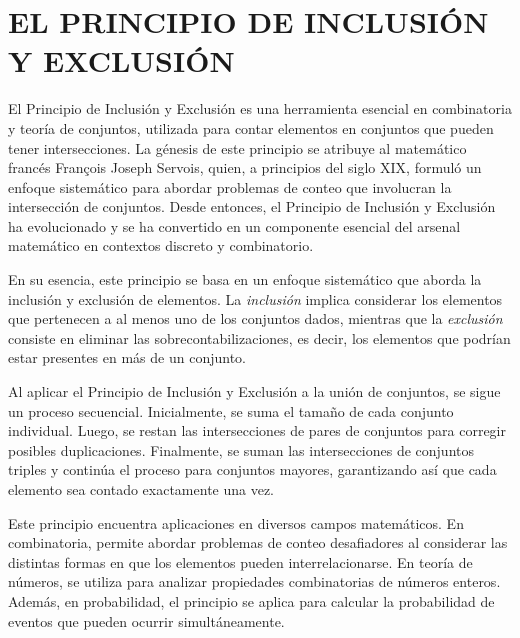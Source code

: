 \chapterspaceabove{6.75cm} %
\chapterspacebelow{7.25cm} %


\chapter{EL PRINCIPIO DE INCLUSIÓN Y EXCLUSIÓN}

El Principio de Inclusión y Exclusión es una herramienta esencial en combinatoria y teoría de conjuntos, utilizada para contar elementos en conjuntos que pueden tener intersecciones. La génesis de este principio se atribuye al matemático francés François Joseph Servois, quien, a principios del siglo XIX, formuló un enfoque sistemático para abordar problemas de conteo que involucran la intersección de conjuntos. Desde entonces, el Principio de Inclusión y Exclusión ha evolucionado y se ha convertido en un componente esencial del arsenal matemático en contextos discreto y combinatorio.

En su esencia, este principio se basa en un enfoque sistemático que aborda la inclusión y exclusión de elementos. La \textit{inclusión} implica considerar los elementos que pertenecen a al menos uno de los conjuntos dados, mientras que la \textit{exclusión} consiste en eliminar las sobrecontabilizaciones, es decir, los elementos que podrían estar presentes en más de un conjunto.

Al aplicar el Principio de Inclusión y Exclusión a la unión de conjuntos, se sigue un proceso secuencial. Inicialmente, se suma el tamaño de cada conjunto individual. Luego, se restan las intersecciones de pares de conjuntos para corregir posibles duplicaciones. Finalmente, se suman las intersecciones de conjuntos triples y continúa el proceso para conjuntos mayores, garantizando así que cada elemento sea contado exactamente una vez.

Este principio encuentra aplicaciones en diversos campos matemáticos. En combinatoria, permite abordar problemas de conteo desafiadores al considerar las distintas formas en que los elementos pueden interrelacionarse. En teoría de números, se utiliza para analizar propiedades combinatorias de números enteros. Además, en probabilidad, el principio se aplica para calcular la probabilidad de eventos que pueden ocurrir simultáneamente.

